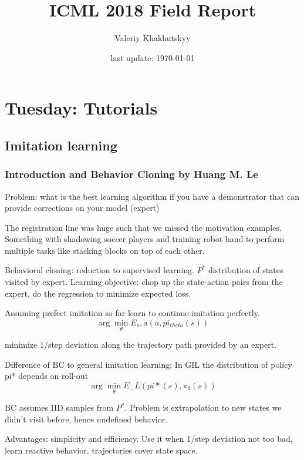 \documentclass[11pt,oneside,a4paper]{scrartcl}
\begin{document}
\title{ICML 2018 Field Report}
\author{Valeriy Khakhutskyy}
\date{last update: \today}
\maketitle


\section{Tuesday: Tutorials}
\label{ch:tuesday}

\subsection{Imitation learning}
\label{sec:tutor-imit-learn}

\subsubsection{Introduction and Behavior Cloning by Huang M. Le}
\label{sec:intr-behav-clon}


Problem: what is the best learning algorithm if you have a
demonstrator that can provide corrections on your model (expert)


The registration line was huge such that we missed the motivation
examples. Something with shadowing soccer players and training robot
hand to perform multiple tasks like stacking blocks on top of each
other.

Behavioral cloning: reduction to supervised learning. $P^*$ distribution
of states visited by expert. Learning objective: chop up the
state-action pairs from the expert, do the regression to minimize
expected loss.

Assuming prefect imitation so far learn to continue imitation
perfectly. $$\arg\min_\theta E_s,a (a, pi_{theta}(s))$$

minimize 1/step deviation along the trajectory path provided by an
expert.

Difference of BC to general imitation learning:  In GIL the
distribution of policy pi* depends on roll-out
$$ \arg\min_{\theta} E_{\ldots} L(pi*(s), \pi_\theta(s))$$


BC assumes IID samples from $P^*$. Problem is extrapolation to new
states we didn't visit before, hence undefined behavior.

Advantages: simplicity and efficiency. Use it when 1/step deviation
not too bad, learn reactive behavior, trajectories cover state space.
\end{document}
